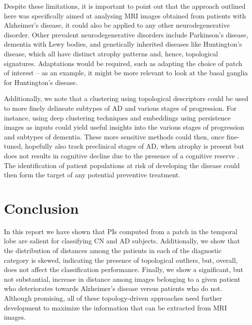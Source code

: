 \documentclass{article}
\begin{document}
Despite these limitations, it is important to point out that the approach outlined here was specifically aimed at analysing  MRI images obtained from patients with Alzheimer's disease, it could also be applied to any other neurodegenerative disorder. Other prevalent neurodegenerative disorders include Parkinson's disease, dementia with Lewy bodies, and genetically inherited diseases like Huntington's disease, which all have distinct atrophy patterns and, hence, topological signatures. Adaptations would be required, such as adapting the choice of patch of interest -- as an example, it might be more relevant to look at the basal ganglia for Huntington's disease.

Additionally, we note that a clustering using topological descriptors could be used to more finely delineate subtypes of AD and various stages of progression. For instance, using deep clustering techniques and embeddings using persistence images as inputs could yield useful insights into the various stages of progression and subtypes of dementia. These more sensitive methods could then, once fine-tuned, hopefully also track preclinical stages of AD, when atrophy is present but does not results in cognitive decline due to the presence of a cognitive reserve \citep{scarmeas2004cognitive, van2017neuroimaging}. The identification of patient populations at risk of developing the disease could then form the target of any potential preventive treatment.

\section{Conclusion}

In this report we have shown that PIs computed from a patch in the temporal lobe are salient for classifying CN and AD subjects. Additionally, we show that the distribution of distances among the patients in each of the diagnostic category is skewed, indicating the presence of topological outliers, but, overall, does not affect the classification performance. Finally, we show a significant, but not substantial, increase in distance among images belonging to a given patient who deteriorates towards Alzheimer's disease versus patients who do not. Although promising, all of these topology-driven approaches need further development to maximize the information that can be extracted from MRI images.

\clearpage



\clearpage
\appendix
\end{document}
